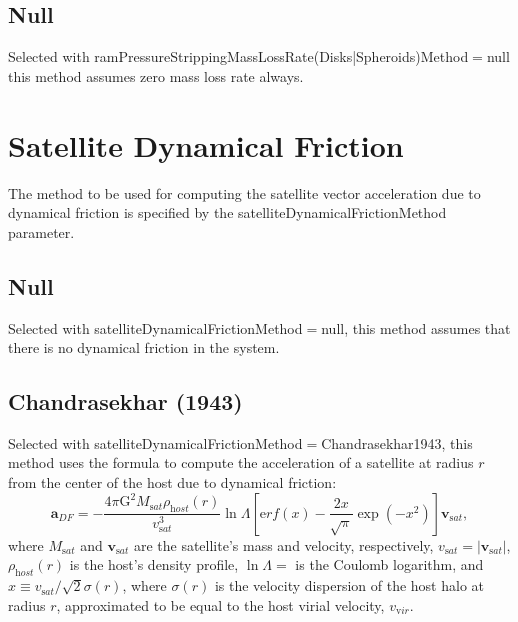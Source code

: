 \subsection{Null}

Selected with {\normalfont \ttfamily ramPressureStrippingMassLossRate(Disks|Spheroids)Method}$=${\normalfont \ttfamily null} this method assumes zero mass loss rate always.

\section{Satellite Dynamical Friction}\label{sec:satelliteDynamicalFrictionMethod}

The method to be used for computing the satellite vector acceleration due to dynamical friction is specified by the {\normalfont \ttfamily satelliteDynamicalFrictionMethod} parameter.

\subsection{Null}

Selected with {\normalfont \ttfamily satelliteDynamicalFrictionMethod}$=${\normalfont \ttfamily null}, this method assumes that there is no dynamical friction in the system.

\subsection{Chandrasekhar (1943)}

Selected with {\normalfont \ttfamily satelliteDynamicalFrictionMethod}$=${\normalfont \ttfamily Chandrasekhar1943}, this method uses the \cite{chandrasekhar_dynamical_1943} formula to compute the acceleration of a satellite at radius $r$ from the center of the host due to dynamical friction:
\begin{equation}
{\mathbf a}_{DF} = -\frac{4\pi {\mathrm G}^2M_{\mathrm sat}\rho_{\mathrm host}(r)}{v_{\mathrm sat}^3}\ln \Lambda\left[{\mathrm erf}(x)-\frac{2x}{\sqrt{\pi}}\exp(-x^2)\right]\mathbf{v}_{\mathrm sat},
\end{equation}
where $M_{\mathrm sat}$ and $\mathbf{v}_{\mathrm sat}$ are the satellite's mass and velocity, respectively, $v_{\mathrm sat}=|\mathbf{v}_{\mathrm sat}|$, $\rho_{\mathrm host}(r)$ is the host's density profile, $\ln\Lambda=${\normalfont \ttfamily [satelliteDynamicalFrictionChandrasekharCoulombLogarithm]} is the Coulomb logarithm, and $x\equiv v_{\mathrm sat}/\sqrt{2}\sigma(r)$, where $\sigma(r)$ is the velocity dispersion of the host halo at radius $r$, approximated to be equal to the host virial velocity, $v_{\mathrm vir}$.

